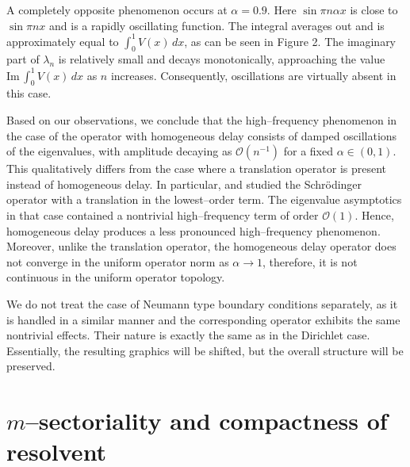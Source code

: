 \documentclass[11pt,centertags,reqno,twoside]{amsart}
\numberwithin{equation}{section}
\theoremstyle{definition}
\theoremstyle{remark}
\begin{document}
A completely opposite phenomenon occurs at $\alpha=0.9$. Here $\sin\pi n\alpha x$
is close to $\sin\pi nx$ and is a rapidly oscillating function. The integral averages
out and is approximately equal to $\int_0^1V(x)\,dx$, as can be seen in Figure 2.
The imaginary part of $\lambda_n$ is relatively small and decays monotonically, approaching
the value $\mathrm{Im}\,\int_0^1V(x)\,dx$ as $n$ increases. Consequently,
oscillations are virtually absent in this case.

Based on our observations, we conclude that the high--frequency phenomenon in the case
of the operator with homogeneous delay consists of damped oscillations of the
eigenvalues, with amplitude decaying as $\mathcal{O}(n^{-1})$ for a fixed
$\alpha\in (0, 1)$. This qualitatively differs from the case where a translation
operator is present instead of homogeneous delay. In particular, \cite{BorPolIzv} and
\cite{BorPolM2AS} studied the Schr\"odinger operator with a translation in
the lowest--order term. The eigenvalue asymptotics in that case contained
a nontrivial high--frequency term of order $\mathcal{O}(1)$. Hence, homogeneous delay
produces a less pronounced high--frequency phenomenon. Moreover, unlike the
translation operator, the homogeneous delay operator does not converge in the
uniform operator norm as $\alpha\to 1$, therefore, it is not continuous in the uniform
operator topology.

We do not treat the case of Neumann type boundary conditions separately,
as it is handled in a similar manner and the corresponding operator exhibits the
same nontrivial effects. Their nature is exactly the same as in the Dirichlet case.
Essentially, the resulting graphics will be shifted, but the overall structure
will be preserved.

\section{$m$--sectoriality and compactness of resolvent}\label{sec3*}
\end{document}
